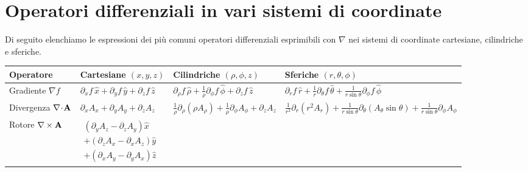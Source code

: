 \chapter{Operatori differenziali in vari sistemi di coordinate}
Di seguito elenchiamo le espressioni dei più comuni operatori differenziali esprimibili con $ \nabla $ nei sistemi di coordinate cartesiane, cilindriche e 
sferiche.

\begin{table}[h]
\centering
\renewcommand{\arraystretch}{2.3}

\begin{tabular}{>{\raggedright\arraybackslash}p{2.2cm} 
                >{\raggedright\arraybackslash}p{4.2cm} 
                >{\raggedright\arraybackslash}p{4.6cm} 
                >{\raggedright\arraybackslash}p{4.6cm}}

\toprule
Operatore & Cartesiane $(x,y,z)$ & Cilindriche $(\rho,\phi,z)$ & Sferiche $(r,\theta,\phi)$ \\
\midrule

Gradiente $\nabla f$

& $\partial_x f\,\hat{x}+\partial_y f\,\hat{y}+\partial_z f\,\hat{z}$

& $\partial_\rho f\,\hat{\rho}
+\frac{1}{\rho}\partial_\phi f\,\hat{\phi}
+\partial_z f\,\hat{z}$

& $\partial_r f\,\hat{r}
+\frac{1}{r}\partial_\theta f\,\hat{\theta}
+\frac{1}{r\sin\theta}\partial_\phi f\,\hat{\phi}$

\\

Divergenza $\nabla\!\cdot\!\mathbf{A}$

& $\partial_x A_x+\partial_y A_y+\partial_z A_z$

& $\frac{1}{\rho}\partial_\rho(\rho A_\rho)
+\frac{1}{\rho}\partial_\phi A_\phi
+\partial_z A_z$

& $\frac{1}{r^2}\partial_r(r^2A_r)
+\frac{1}{r\sin\theta}\partial_\theta(A_\theta\sin\theta)
+\frac{1}{r\sin\theta}\partial_\phi A_\phi$

\\

Rotore $\nabla\times\mathbf{A}$

& $\begin{aligned}
(\partial_yA_z-\partial_zA_y)\hat{x} \\
+(\partial_zA_x-\partial_xA_z)\hat{y} \\
+(\partial_xA_y-\partial_yA_x)\hat{z}
\end{aligned}$


\end{tabular}
\end{table}
